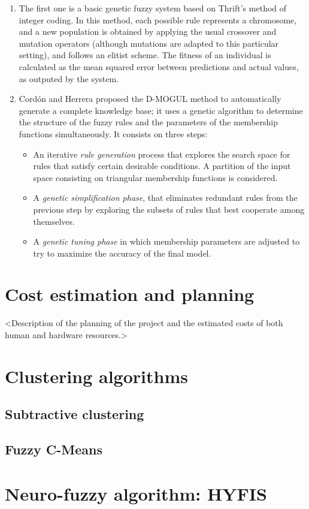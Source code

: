\begin{enumerate}[1.]
  \item The first one is a basic genetic fuzzy system based on Thrift's method \cite{thrift1991genetic} of integer coding. In this method, each possible rule represents a chromosome, and a new population is obtained by applying the usual crossover and mutation operators (although mutations are adapted to this particular setting), and follows an elitist scheme. The fitness of an individual is calculated as the mean squared error between predictions and actual values, as outputed by the system.
  \item Cordón and Herrera proposed the D-MOGUL method \cite{cordon1997three} to automatically generate a complete knowledge base; it uses a genetic algorithm to determine the structure of the fuzzy rules and the parameters of the membership functions simultaneously. It consists on three steps:
  \begin{itemize}
    \item An iterative \textit{rule generation} process that explores the search space for rules that satisfy certain desirable conditions. A partition of the input space consisting on triangular membership functions is considered.
    \item A \textit{genetic simplification phase}, that eliminates redundant rules from the previous step by exploring the subsets of rules that best cooperate among themselves.
    \item A \textit{genetic tuning phase} in which membership parameters are adjusted to try to maximize the accuracy of the final model.
  \end{itemize}
\end{enumerate}

\section{Cost estimation and planning}

<Description of the planning of the project and the estimated costs of both human and hardware resources.>

\section{Clustering algorithms}
\subsection{Subtractive clustering}
\subsection{Fuzzy C-Means}
\section{Neuro-fuzzy algorithm: HYFIS}
